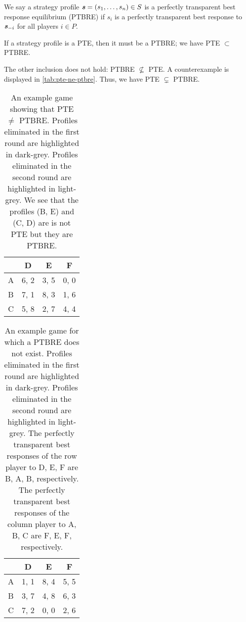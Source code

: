\begin{definition}
	We say a strategy profile $\boldsymbol{\mathit{s}} = (s_1, \dots, s_n) \in S$ is a perfectly transparent best response equilibrium (PTBRE) if $s_i$ is a perfectly transparent best response to $\boldsymbol{\mathit{s}}_{-i}$ for all players $i \in P$.
\end{definition}

\begin{observation}
	\label{th:tbre-subset-pte}
	If a strategy profile is a PTE, then it must be a PTBRE; we have PTE $\subset$ PTBRE.
\end{observation}

\begin{remark}
	The other inclusion does not hold: PTBRE $\not\subseteq$ PTE.
	A counterexample is displayed in \autoref{tab:pte-ne-ptbre}.
	Thus, we have PTE $\subsetneq$ PTBRE.
\end{remark}

\begin{table}
	\caption{
		An example game showing that PTE $\ne$ PTBRE.
		Profiles eliminated in the first round are highlighted in \colorbox{gray!70}{dark-grey}.
		Profiles eliminated in the second round are highlighted in \colorbox{gray!20}{light-grey}.
		We see that the profiles (B, E) and (C, D) are is not PTE but they are PTBRE.
	}
	\label{tab:pte-ne-ptbre}
	\centering
	\begin{tabular}{|c|c|c|c|}
		\hline
			& D		& E	   & F	  \\
		\hline
		A 		&\cellcolor{gray!70} 6, 2 &\cellcolor{gray!20} 3, 5 &\cellcolor{gray!70} 0, 0 \\
		\hline
		B		&\cellcolor{gray!70} 7, 1 &\cellcolor{gray!20} 8, 3 &\cellcolor{gray!70} 1, 6 \\
		\hline
		C		&\cellcolor{gray!20} 5, 8 &\cellcolor{gray!20} 2, 7 &\cellcolor{gray!20} 4, 4 \\
		\hline
	\end{tabular}
\end{table}

\begin{table}
	\caption{
		An example game for which a PTBRE does not exist.
		Profiles eliminated in the first round are highlighted in \colorbox{gray!70}{dark-grey}.
		Profiles eliminated in the second round are highlighted in \colorbox{gray!20}{light-grey}.
		The perfectly transparent best responses of the row player to D, E, F are B, A, B, respectively.
		The perfectly transparent best responses of the column player to A, B, C are F, E, F, respectively.
	}
	\label{tab:no-ptbre}
	\centering
	\begin{tabular}{|c|c|c|c|}
		\hline
			& D		& E	   & F	  \\
		\hline
		A 		&\cellcolor{gray!70} 1, 1 &\cellcolor{gray!20} 8, 4 &\cellcolor{gray!20} 5, 5 \\
		\hline
		B		&\cellcolor{gray!20} 3, 7 &\cellcolor{gray!20} 4, 8 &\cellcolor{gray!20} 6, 3 \\
		\hline
		C		&\cellcolor{gray!70} 7, 2 &\cellcolor{gray!70} 0, 0 &\cellcolor{gray!70} 2, 6 \\
		\hline
	\end{tabular}
\end{table}

